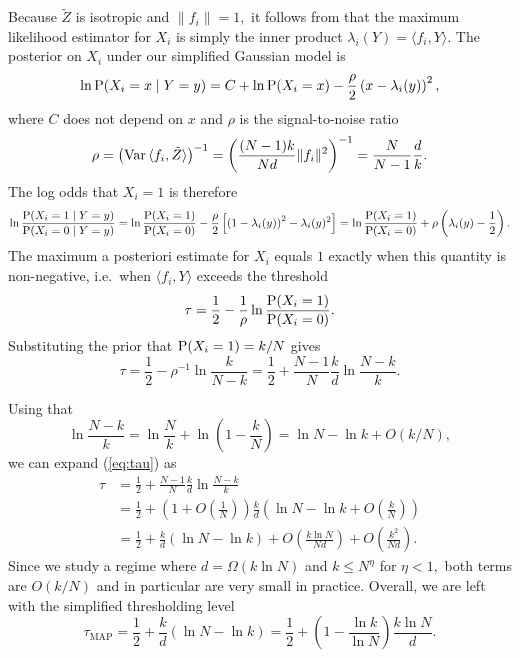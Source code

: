 Because $\tilde Z$ is isotropic and $\lVert f_i \rVert = 1,$ it follows from  that the maximum likelihood estimator for $X_i$ is simply the inner product $\lambda_i(Y) = \langle f_i, Y \rangle.$ The posterior on $X_i$ under our simplified Gaussian model is
$$
\ln \operatorname{P}(X_i = x \mid Y = y) = C + \ln \operatorname{P}(X_i = x) -\frac{\rho}{2} \left( x - \lambda_i(y) \right)^2,
$$
where $C$ does not depend on $x$ and $\rho$ is the signal-to-noise ratio
$$
\rho = \left( \operatorname{Var}\, \langle f_i, \tilde Z \rangle \right)^{-1} = \left( \frac{(N - 1)k}{Nd} \lVert f_i \rVert^2 \right)^{-1} = \frac N {N - 1} \frac{d}{k}.
$$
The log odds that $X_i = 1$ is therefore
$$
\ln \frac{\operatorname{P}(X_i = 1 \mid Y = y)}{\operatorname{P}(X_i = 0 \mid Y = y)} = \ln \frac{\operatorname{P}(X_i = 1)}{\operatorname{P}(X_i = 0)} - \frac{\rho}{2} \left[ \left(1 - \lambda_i(y)\right)^2 - \lambda_i(y)^2 \right] = \ln \frac{\operatorname{P}(X_i = 1)}{\operatorname{P}(X_i = 0)} + \rho \left( \lambda_i(y) - \frac 1 2 \right).
$$
The maximum a posteriori estimate for $X_i$ equals $1$ exactly when this quantity is non-negative, i.e.\ when $\langle f_i, Y \rangle$ exceeds the threshold
$$
\tau = \frac 1 2 - \frac{1}{\rho} \ln \frac{\operatorname{P}(X_i = 1)}{\operatorname{P}(X_i = 0)}.
$$
Substituting the prior that $\operatorname{P}(X_i = 1) = k/N$ gives
\begin{equation}
\tau = \frac 1 2 - \rho^{-1} \ln \frac k {N - k} = \frac 1 2 + \frac{N - 1} N \frac{k}{d} \ln \frac{N - k}{k}. \label{eq:tau}
\end{equation}

Using that
$$
\ln \frac{N - k}{k} = \ln \frac N k + \ln\left( 1 - \frac k N \right) = \ln N - \ln k + O(k/N),
$$
we can expand (\ref{eq:tau}) as
\begin{align*}
\tau
& = \frac 1 2 + \frac{N - 1} N \frac{k}{d} \ln \frac{N - k}{k} \\
& = \frac 1 2 + \left(1 + O\!\left(\tfrac 1 N \right)\right) \frac k d \left( \ln N - \ln k + O\!\left(\tfrac k N\right) \right) \\
& = \frac 1 2 + \frac k d \left( \ln N - \ln k \right) + O\!\left( \frac{k \ln N}{Nd} \right) + O\!\left( \frac{k^2}{Nd} \right).
\end{align*}
Since we study a regime where $d = \Omega(k \ln N)$ and $k \le N^\eta$ for $\eta < 1,$ both terms are $O(k/N)$ and in particular are very small in practice. Overall, we are left with the simplified thresholding level
$$
\tau_\text{MAP} = \frac 1 2 + \frac k d \left( \ln N - \ln k \right) = \frac 1 2 + \left(1 - \frac{\ln k}{\ln N} \right) \frac{k \ln N}{d}.
$$
